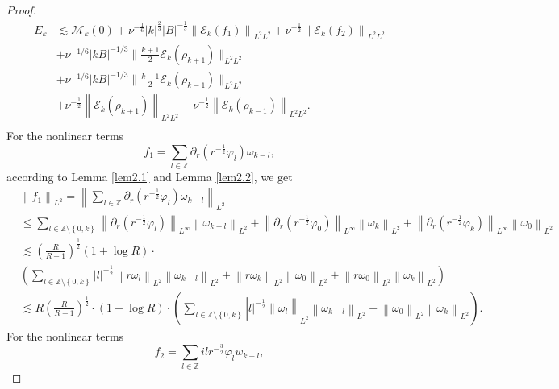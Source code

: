 \documentclass[final, 12pt,reqno]{amsart}
\numberwithin{equation}{section}
\begin{document}
\begin{proof}
\begin{equation}
\begin{aligned}
    E_k&\lesssim \mathcal{M}_k(0)+\nu^{-\frac{1}{6}}|k|^{\frac{2}{3}}|B|^{-\frac{1}{3}}\left\|\mathcal{E}_k (f_1)\right\|_{L^2 L^2}+\nu^{-\frac{1}{2}}\left\|\mathcal{E}_k (f_2)\right\|_{L^2 L^2}\\
 &+\nu^{-1/6}|kB|^{-1/3}\|\frac{k+1}{2}\mathcal{E}_k(\rho_{k+1})\|_{L^2L^2}\\
    &+\nu^{-1/6}|kB|^{-1/3}\|\frac{k-1}{2}\mathcal{E}_k(\rho_{k-1})\|_{L^2L^2}\\
 &+\nu^{-\frac{1}{2}}\left\|\mathcal{E}_k (\rho_{k+1})\right\|_{L^2 L^2}+\nu^{-\frac{1}{2}}\left\|\mathcal{E}_k (\rho_{k-1})\right\|_{L^2 L^2}.\\
    &
\end{aligned}
\end{equation}
 For the  nonlinear terms
$$
f_1=\sum_{l \in \mathbb{Z}} \partial_r\left(r^{-\frac{1}{2}} \varphi_l\right) \omega_{k-l},
$$
according to Lemma \ref{lem2.1} and Lemma \ref{lem2.2},
we get
{\small
\begin{equation}
    \begin{aligned}
     &\left\|f_1\right\|_{L^2}
 =\left\|\sum_{l \in \mathbb{Z}} \partial_r\left(r^{-\frac{1}{2}} \varphi_l\right) \omega_{k-l}\right\|_{L^2} \\
     &\leq \sum_{l \in \mathbb{Z} \setminus\left\lbrace 0, k\right\rbrace }\left\|\partial_r\left(r^{-\frac{1}{2}} \varphi_l \right)\right\|_ {L ^\infty}\left\|\omega_{k-l}\right\|_{L^2}+\left\|\partial_r\left(r^{-\frac{1}{2}} \varphi_0\right)\right\|_ {L^\infty }\left\|\omega_k\right\|_{L^2}+\left\|\partial_r\left(r^{-\frac{1}{2}} \varphi_k\right)\right\| _{L^ \infty}\left\|\omega_0\right\|_{L^2}\\
 & \lesssim \left(\frac{R}{R-1}\right)^{\frac{1}{2}} (1+\log R)\cdot\\
 &\left(\sum_{l \in \mathbb{Z} \setminus\left\lbrace 0, k\right\rbrace }|l|^{-\frac{1}{2}}\left\|r\omega_l\right\|_ {L ^2}\left\|\omega_{k-l}\right\|_{L^2}+\left\|r\omega_k\right\|_ {L^2 }\left\|\omega_0\right\|_{L^2}+\left\|r\omega_0\right\|_{L^2 }\left\|\omega_k\right\|_{L^2}\right)\\
    & \lesssim R\left(\frac{R}{R-1}\right)^{\frac{1}{2}} \cdot(1+\log R) \cdot\left(\sum_{l \in \mathbb{Z} \setminus\left\lbrace 0, k\right\rbrace }\left|l|^{-\frac{1}{2}}\|\omega_l\right\|_{L^2}\left\|\omega_{k-l}\right\|_{L^2}+\left\|\omega_0\right\|_{L^2}\left\|\omega_k\right\|_{L^2}\right).
\end{aligned}
\end{equation}}
 For the  nonlinear terms
 $$
f_2=\sum_{l \in \mathbb{Z}} i l r^{-\frac{3}{2}} \varphi_l w_{k-l},
$$
\end{proof}
\end{document}
